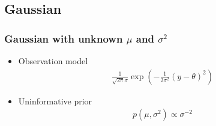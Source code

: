 \documentclass[10pt]{beamer}
\begin{document}
\subsection{Gaussian}

\begin{frame}
\frametitle{Gaussian with unknown $\mu$ and $\sigma^2$}

\begin{itemize}
\item Observation model
  \begin{align*}
   \frac{1}{\sqrt{2\pi}\sigma}\exp\left(-\frac{1}{2\sigma^2}(y-\theta)^2 \right)
   \end{align*}
\item Uninformative prior
  \begin{align*}
    p(\mu,\sigma^2)\propto \sigma^{-2}
  \end{align*}
\end{itemize}

\end{frame}
\end{document}
